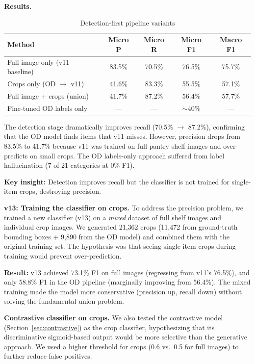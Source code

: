 \documentclass[11pt]{article}
\begin{document}
\textbf{Results.}

\begin{table}[h]
\centering
\caption{Detection-first pipeline variants}
\label{tab:detection}
\begin{tabular}{lcccc}
\toprule
Method & Micro P & Micro R & Micro F1 & Macro F1 \\
\midrule
Full image only (v11 baseline) & 83.5\% & 70.5\% & 76.5\% & 75.7\% \\
Crops only (OD $\rightarrow$ v11) & 41.6\% & 83.3\% & 55.5\% & 57.1\% \\
Full image + crops (union) & 41.7\% & 87.2\% & 56.4\% & 57.7\% \\
Fine-tuned OD labels only & --- & --- & $\sim$40\% & --- \\
\bottomrule
\end{tabular}
\end{table}

The detection stage dramatically improves recall (70.5\% $\rightarrow$ 87.2\%), confirming that the OD model finds items that v11 misses. However, precision drops from 83.5\% to 41.7\% because v11 was trained on full pantry shelf images and over-predicts on small crops. The OD labels-only approach suffered from label hallucination (7 of 21 categories at 0\% F1).

\textbf{Key insight:} Detection improves recall but the classifier is not trained for single-item crops, destroying precision.

\textbf{v13: Training the classifier on crops.} To address the precision problem, we trained a new classifier (v13) on a \textit{mixed} dataset of full shelf images and individual crop images. We generated 21,362 crops (11,472 from ground-truth bounding boxes + 9,890 from the OD model) and combined them with the original training set. The hypothesis was that seeing single-item crops during training would prevent over-prediction.

\textbf{Result:} v13 achieved 73.1\% F1 on full images (regressing from v11's 76.5\%), and only 58.8\% F1 in the OD pipeline (marginally improving from 56.4\%). The mixed training made the model more conservative (precision up, recall down) without solving the fundamental union problem.

\textbf{Contrastive classifier on crops.} We also tested the contrastive model (Section~\ref{sec:contrastive}) as the crop classifier, hypothesizing that its discriminative sigmoid-based output would be more selective than the generative approach. We used a higher threshold for crops (0.6 vs.\ 0.5 for full images) to further reduce false positives.
\end{document}
